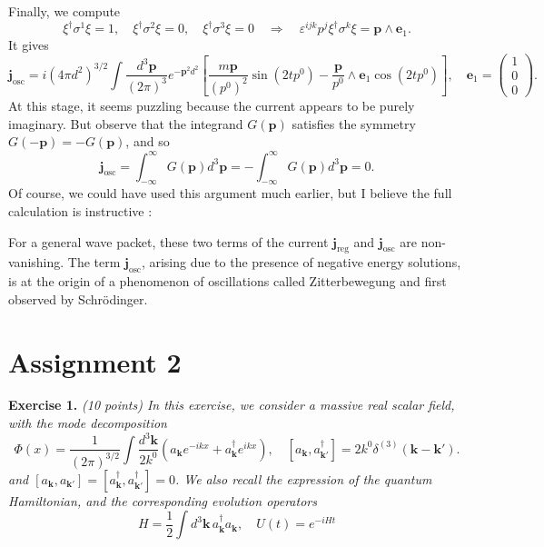 Finally, we compute
\begin{equation}
    \xi^\dagger\sigma^1\xi = 1, \quad \xi^\dagger\sigma^2\xi = 0, \quad \xi^\dagger\sigma^3\xi = 0 \quad \Rightarrow \quad \varepsilon^{ijk}p^j\xi^\dagger\sigma^k\xi = \mathbf{p} \wedge \mathbf{e}_1.
\end{equation}
It gives
\begin{equation}
    \mathbf{j}_{\text{osc}} = i(4\pi d^2)^{3/2} \int \frac{d^3\mathbf{p}}{(2\pi)^3} e^{-\mathbf{p}^2d^2} \left[ \frac{m\mathbf{p}}{(p^0)^2}\sin(2tp^0) - \frac{\mathbf{p}}{p^0} \wedge \mathbf{e}_1 \cos(2tp^0) \right], \quad \mathbf{e}_1 = \begin{pmatrix} 1 \\ 0 \\ 0 \end{pmatrix}.
\end{equation}
At this stage, it seems puzzling because the current appears to be purely imaginary. But observe that the integrand $G(\mathbf{p})$ satisfies the symmetry $G(-\mathbf{p}) = -G(\mathbf{p})$, and so
\begin{equation}
    \mathbf{j}_{\text{osc}} = \int_{-\infty}^\infty G(\mathbf{p})d^3\mathbf{p} = -\int_{-\infty}^\infty G(\mathbf{p})d^3\mathbf{p} = 0.
\end{equation}
Of course, we could have used this argument much earlier, but I believe the full calculation is instructive :

For a general wave packet, these two terms of the current $\mathbf{j}_{\text{reg}}$ and $\mathbf{j}_{\text{osc}}$ are non-vanishing. The term $\mathbf{j}_{\text{osc}}$, arising due to the presence of negative energy solutions, is at the origin of a phenomenon of oscillations called Zitterbewegung and first observed by Schrödinger.

\printfootnotes


\section{Assignment 2}
\textbf{Exercise 1.} \textit{(10 points) In this exercise, we consider a massive real scalar field, with the mode decomposition}
\begin{equation}
    \Phi(x) = \frac{1}{(2\pi)^{3/2}} \int \frac{d^3\mathbf{k}}{2k^0} (a_{\mathbf{k}}e^{-ikx} + a^\dagger_{\mathbf{k}}e^{ikx}), \quad [a_{\mathbf{k}}, a^\dagger_{\mathbf{k}'}] = 2k^0\delta^{(3)}(\mathbf{k} - \mathbf{k}').
\end{equation}
\textit{and $[a_{\mathbf{k}}, a_{\mathbf{k}'}] = [a^\dagger_{\mathbf{k}}, a^\dagger_{\mathbf{k}'}] = 0$. We also recall the expression of the quantum Hamiltonian, and the corresponding evolution operators}
\begin{equation}
    H = \frac{1}{2} \int d^3\mathbf{k} \, a^\dagger_{\mathbf{k}} a_{\mathbf{k}}, \quad U(t) = e^{-iHt}
\end{equation}


